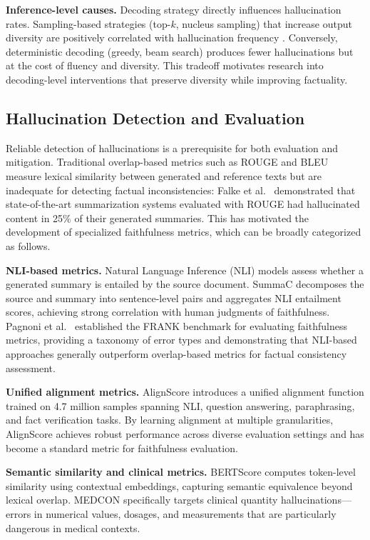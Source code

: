 \documentclass[12pt,a4paper,oneside]{report}
\begin{document}
\textbf{Inference-level causes.} Decoding strategy directly influences hallucination rates. Sampling-based strategies (top-$k$, nucleus sampling) that increase output diversity are positively correlated with hallucination frequency \cite{holtzman2020curious, ji2023hallucination}. Conversely, deterministic decoding (greedy, beam search) produces fewer hallucinations but at the cost of fluency and diversity. This tradeoff motivates research into decoding-level interventions that preserve diversity while improving factuality.


\subsection{Hallucination Detection and Evaluation}
\label{subsec:hallucination-eval}

Reliable detection of hallucinations is a prerequisite for both evaluation and mitigation. Traditional overlap-based metrics such as ROUGE \cite{lin2004rouge} and BLEU \cite{papineni2002bleu} measure lexical similarity between generated and reference texts but are inadequate for detecting factual inconsistencies: Falke et al.~\cite{falke2019ranking} demonstrated that state-of-the-art summarization systems evaluated with ROUGE had hallucinated content in 25\% of their generated summaries. This has motivated the development of specialized faithfulness metrics, which can be broadly categorized as follows.

\textbf{NLI-based metrics.} Natural Language Inference (NLI) models assess whether a generated summary is entailed by the source document. SummaC \cite{laban2022summac} decomposes the source and summary into sentence-level pairs and aggregates NLI entailment scores, achieving strong correlation with human judgments of faithfulness. Pagnoni et al.~\cite{pagnoni2021frank} established the FRANK benchmark for evaluating faithfulness metrics, providing a taxonomy of error types and demonstrating that NLI-based approaches generally outperform overlap-based metrics for factual consistency assessment.

\textbf{Unified alignment metrics.} AlignScore \cite{zha2023alignscore} introduces a unified alignment function trained on 4.7 million samples spanning NLI, question answering, paraphrasing, and fact verification tasks. By learning alignment at multiple granularities, AlignScore achieves robust performance across diverse evaluation settings and has become a standard metric for faithfulness evaluation.

\textbf{Semantic similarity and clinical metrics.} BERTScore \cite{zhang2020bertscore} computes token-level similarity using contextual embeddings, capturing semantic equivalence beyond lexical overlap. MEDCON \cite{yim2023medcon} specifically targets clinical quantity hallucinations---errors in numerical values, dosages, and measurements that are particularly dangerous in medical contexts.
\end{document}
